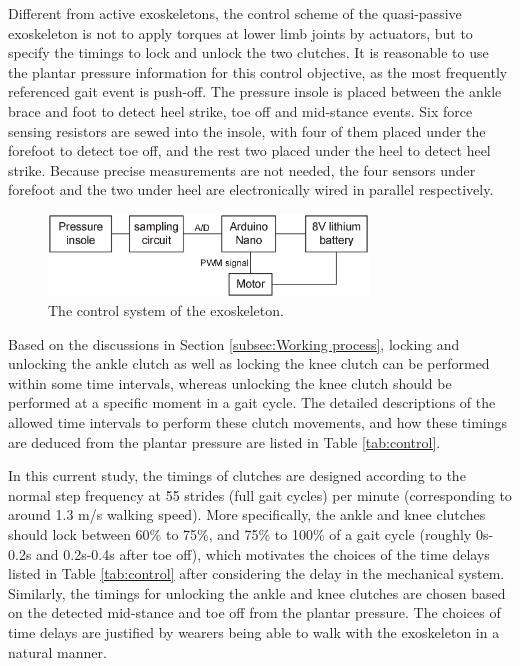 \documentclass[10pt]{asme2ej}
\begin{document}
Different from active exoskeletons, the control scheme of the quasi-passive exoskeleton is not to apply torques at lower limb joints by actuators, but to specify the timings to lock and unlock the two clutches.
It is reasonable to use the plantar pressure information for this control objective, as the most frequently referenced gait event is push-off.
The pressure insole is placed between the ankle brace and foot to detect heel strike, toe off and mid-stance events.
Six force sensing resistors are sewed into the insole, with four of them placed under the forefoot to detect toe off, and the rest two placed under the heel to detect heel strike.
Because precise measurements are not needed, the four sensors under forefoot and the two under heel are electronically wired in parallel respectively. 

\begin{figure}[t]
	\centering
	\includegraphics[width=8.5cm]{control.eps}
	\caption{The control system of the exoskeleton.}
	\label{fig:control}   
\end{figure}

Based on the discussions in Section \ref{subsec:Working process}, locking and unlocking the ankle clutch as well as locking the knee clutch can be performed within some time intervals, whereas unlocking the knee clutch should be performed at a specific moment in a gait cycle.
The detailed descriptions of the allowed time intervals to perform these clutch movements, and how these timings are deduced from the plantar pressure are listed in Table \ref{tab:control}.

In this current study, the timings of clutches are designed according to the normal step frequency at 55 strides (full gait cycles) per minute (corresponding to around 1.3 m/s walking speed).
More specifically, the ankle and knee clutches should lock between 60\% to 75\%, and 75\% to 100\% of a gait cycle (roughly 0s-0.2s and 0.2s-0.4s after toe off), which motivates the choices of the time delays listed in Table \ref{tab:control} after considering the delay in the mechanical system.
Similarly, the timings for unlocking the ankle and knee clutches are chosen based on the detected mid-stance and toe off from the plantar pressure.
The choices of time delays are justified by wearers being able to walk with the exoskeleton in a natural manner.
\end{document}
